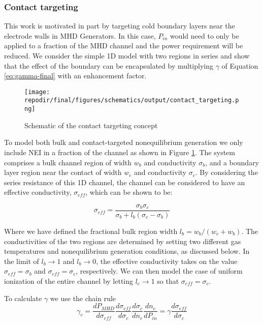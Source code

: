 \subsubsection{Contact targeting}


This work is motivated in part by targeting cold boundary layers near the electrode walls in MHD Generators. In this case, $P_{in}$ would need to only be applied to a fraction of the MHD channel and the power requirement will be reduced. We consider the simple 1D model with two regions in series and show that the effect of the boundary can be encapsulated by multiplying $\gamma$ of Equation \ref{eq:gamma-final} with an enhancement factor.



\begin{figure}[h]
    \centering
    \texttt{[image: \\repodir/final/figures/schematics/output/contact\_targeting.png]} 
    \caption{Schematic of the contact targeting concept}
    \label{fig:SI_contact_targeting_schematic}
\end{figure}


To model both bulk and contact-targeted nonequilibrium generation we only include NEI in a fraction of the channel as shown in Figure \ref{fig:SI_contact_targeting_schematic}. The system comprises a bulk channel region of width $w_{b}$ and conductivity $\sigma_{b}$, and a boundary layer region near the contact of width $w_{c}$ and conductivity $\sigma_{c}$. By considering the series resistance of this 1D channel, the channel can be considered to have an effective conductivity, $\sigma_{eff}$, which can be shown to be:  

\begin{equation}
\sigma_{eff}=\frac{\sigma_{b} \sigma_{c}}{\sigma_{b}+l_{b}  (\sigma_{c}  -\sigma_{b})}
\end{equation}

Where we have defined the fractional bulk region width $l_{b}=w_{b}/(w_{c}+w_{b})$. The conductivities of the two regions are determined by setting two different gas temperatures and nonequilibrium generation conditions, as discussed below. In the limit of $l_{b}\rightarrow1$ and $l_{b}\rightarrow0$, the effective conductivity takes on the value $\sigma_{eff}= \sigma_{b}$ and $\sigma_{eff}= \sigma_{c}$, respectively. We can then model the case of uniform ionization of the entire channel by letting $l_{c}\rightarrow1$ so that $\sigma_{eff}= \sigma_{c}$.

To calculate $\gamma$ we use the chain rule
\begin{equation}
\gamma_{c}=\frac{dP_{MHD}}{d\sigma_{eff}} \frac{d\sigma_{eff}}{d\sigma_{c}} \frac{d\sigma_{c}}{dn_e} \frac{dn_e}{dP_{in}}=\gamma \frac{d\sigma_{eff}}{d\sigma_{c}} 
\end{equation}

